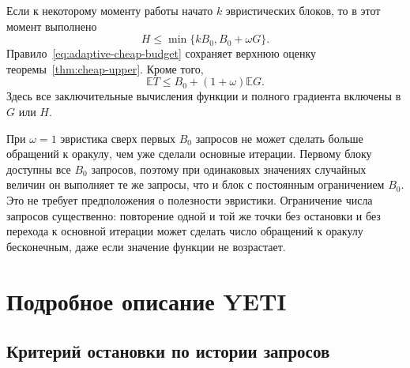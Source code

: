 \begin{theorem}
\label{thm:adaptive-cheap-budget}
Если к некоторому моменту работы начато $k$ эвристических
блоков, то в этот момент выполнено
\begin{equation}\label{eq:budget-prefix-invariant}
 H\le\min\{kB_0,B_0+\omega G\}.
\end{equation}
Правило~\eqref{eq:adaptive-cheap-budget} сохраняет верхнюю оценку
теоремы~\ref{thm:cheap-upper}. Кроме того,
\begin{equation}\label{eq:adaptive-budget-total}
 \mathbb E T\le B_0+(1+\omega)\mathbb E G.
\end{equation}
Здесь все заключительные вычисления функции и полного градиента включены в $G$ или $H$.
\end{theorem}

При $\omega=1$ эвристика сверх первых $B_0$ запросов не может сделать
больше обращений к оракулу, чем уже сделали основные итерации. Первому блоку доступны все $B_0$ запросов,
поэтому при одинаковых значениях случайных величин он выполняет
те же запросы, что и блок с постоянным ограничением $B_0$.
Это не требует предположения о полезности эвристики.
Ограничение числа запросов существенно: повторение одной и той же точки без
остановки и без перехода к основной итерации может сделать
число обращений к оракулу бесконечным, даже если значение функции не возрастает.


\clearpage
\section{Подробное описание YETI}\label{app:implementation}
\subsection{Критерий остановки по истории запросов}


